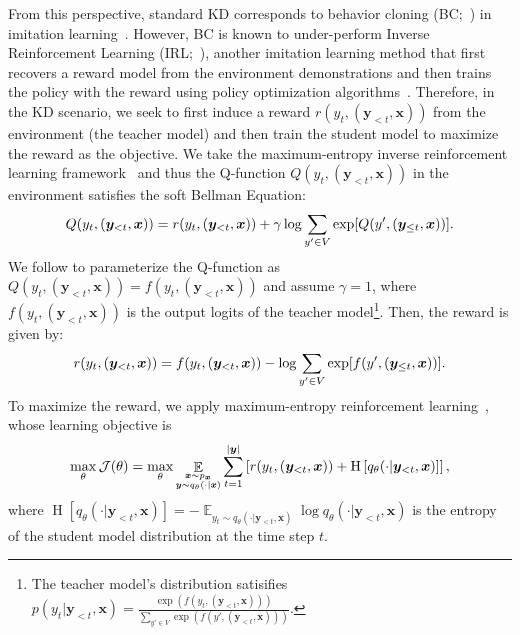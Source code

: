 \documentclass{article}
\def\expct{\mathop{\mathbb{E}}}
\def\ptt{p(y_t | \by_{<t}, \bx)}
\def\ps{q_\theta}
\def\bx{\bm{x}}
\def\by{\bm{y}}
\begin{document}
From this perspective, standard KD corresponds to behavior cloning (BC;~\citealp{behavior_cloning}) in imitation learning~\citep{imitation_learning}. However, BC is known to under-perform Inverse Reinforcement Learning (IRL;~\citealp{maxent_irl}), another imitation learning method that first recovers a reward model from the environment demonstrations and then trains the policy with the reward using policy optimization algorithms~\citep{policy_gradient,ppo}. Therefore, in the KD scenario, we seek to first induce a reward $r(y_t, (\by_{<t},\bx))$ from the environment (the teacher model) and then train the student model to maximize the reward as the objective. We take the maximum-entropy inverse reinforcement learning framework~\citep{maxent_irl,scalable_irl} and thus the
Q-function $Q(y_t, (\by_{<t},\bx))$ in the environment satisfies the soft Bellman Equation:
\begin{equation}
    \small
    Q(y_t, (\by_{<t},\bx)) = r(y_t, (\by_{<t},\bx)) + \gamma \log \sum_{y'\in V} \operatorname{exp}[Q(y', (\by_{\le t}, \bx))].
\end{equation}
We follow \cite{irl_gen} to parameterize the Q-function as $Q(y_t, (\by_{<t}, \bx)) = f(y_t, (\by_{<t}, \bx))$ and assume $\gamma=1$, where $f(y_t, (\by_{<t}, \bx))$ is the output logits of the teacher model\footnote{The teacher model's distribution satisifies $\ptt=\frac{\operatorname{exp}(f(y_t, (\by_{<t},\bx)))}{\sum_{y'\in V}\operatorname{exp}(f(y', (\by_{<t},\bx)))}$.}. Then, the reward is given by:
\begin{equation}
    \small
    r(y_t, (\by_{<t},\bx)) = f(y_t, (\by_{<t},\bx)) - \log \sum_{y'\in V} \operatorname{exp}[f(y', (\by_{\le t}, \bx))].
\end{equation}
To maximize the reward, we apply maximum-entropy reinforcement learning~\cite{max_ent_rl}, whose learning objective is 
\begin{equation}
    \label{eq:rl_obj}
    \small
    \max_{\theta} \mathcal{J}(\theta) = \max_{\theta} \expct_{\substack{\bx \sim p_{\bx} \\ \by \sim \ps (\cdot | \bx)}} \sum_{t=1}^{|\by|} \left[r(y_t, (\by_{<t},\bx)) + \operatorname{H}\left[q_{\theta}(\cdot | \by_{<t}, \bx)\right]\right],
\end{equation}
where $\operatorname{H}\left[q_{\theta}(\cdot | \by_{<t}, \bx)\right] = -\expct_{y_t\sim q_{\theta}(\cdot | \by_{<t}, \bx)}\log q_{\theta}(\cdot | \by_{<t}, \bx)$ is the entropy of the student model distribution at the time step $t$. 
\vspace{-0.1cm}
\end{document}
